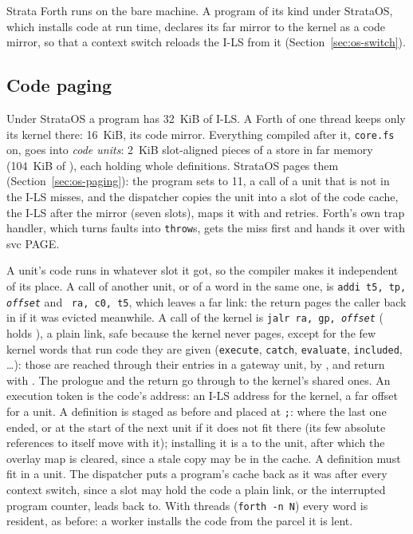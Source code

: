 Strata Forth runs on the bare machine. A program of its kind under StrataOS, which installs code at
run time, declares its far mirror to the kernel as a code mirror, so that a context switch reloads the
I-LS from it (Section~\ref{sec:os-switch}).

\subsection{Code paging}\label{sec:forth-paging}
Under StrataOS a program has 32~KiB of I-LS. A Forth of one thread keeps only its kernel there:
16~KiB, its code mirror. Everything compiled after it, \texttt{core.fs} on, goes into \emph{code
units}: 2~KiB slot-aligned pieces of a store in far memory (104~KiB of ), each holding whole
definitions. StrataOS pages them (Section~\ref{sec:os-paging}): the program sets  to 11,
a call of a unit that is not in the I-LS misses, and the dispatcher copies the unit into a slot of
the code cache, the I-LS after the mirror (seven slots), maps it with  and retries.
Forth's own trap handler, which turns faults into \texttt{throw}s, gets the miss first and hands it
over with svc PAGE.

A unit's code runs in whatever slot it got, so the compiler makes it independent of its place. A
call of another unit, or of a word in the same one, is \texttt{addi t5, tp, \textit{offset}} and
~\texttt{ra, c0, t5}, which leaves a far link: the return pages the caller back in if it
was evicted meanwhile. A call of the kernel is \texttt{jalr ra, gp, \textit{offset}} ( holds
), a plain link, safe because the kernel never pages, except for the few kernel words that
run code they are given (\texttt{execute}, \texttt{catch}, \texttt{evaluate}, \texttt{included},
\ldots): those are reached through their entries in a gateway unit, by , and return with
. The prologue and the return go through  to the kernel's shared ones. An execution
token is the code's address: an I-LS address for the kernel, a far offset for a unit. A definition is
staged as before and placed at \texttt{;}: where the last one ended, or at the start of the next unit
if it does not fit there (its few absolute references to itself move with it); installing it is a
 to the unit, after which the overlay map is cleared, since a stale copy may be in the
cache. A definition must fit in a unit. The dispatcher puts a program's cache back as it was after
every context switch, since a slot may hold the code a plain link, or the interrupted program
counter, leads back to. With threads (\texttt{forth -n N}) every word is resident, as before: a
worker installs the code from the parcel it is lent.

